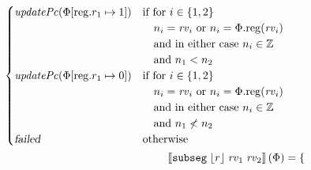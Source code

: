 \documentclass[a4paper]{article}
\newcommand{\update}[2]{[#1 \mapsto #2]}
\newcommand{\sem}[1]{\left\llbracket #1 \right\rrbracket}
\newcommand{\var}[1]{\mathit{#1}}
\newcommand{\rv}{\var{rv}}
\newcommand{\plainproj}[1]{\mathrm{#1}}
\newcommand{\memreg}[1][\Phi]{#1.\plainproj{reg}}
\newcommand{\updateReg}[3][\Phi]{#1\update{\plainproj{reg}.#2}{#3}}
\newcommand{\failed}{\textsl{failed}}
\newcommand{\plainfun}[2]{
  \ifthenelse{\equal{#2}{}}
  {\mathit{#1}}
  {\mathit{#1}(#2)}
}
\newcommand{\stdUpdatePc}[1]{\plainfun{updatePc}{#1}}
\newcommand{\ints}{\mathbb{Z}}
\newcommand{\refreg}[1]{\lfloor #1 \rfloor}
\newcommand{\zinstr}[1]{\mathtt{#1}}
\newcommand{\threeinstr}[4]{\zinstr{#1} \; #2 \; #3 \; #4}
\newcommand{\subseg}[3]{\threeinstr{subseg}{#1}{#2}{#3}}
\begin{document}
\begin{align*}
                                                          \begin{cases}
                                                            \stdUpdatePc{\updateReg{r_1}{1}} &
                                                            \arraycolsep=0pt
                                                            \begin{array}[t]{l}
                                                              \text{if for $i \in \{1,2\}$}\\
                                                              \quad\text{$n_i = \rv_i$ or $n_i = \memreg(\rv_i)$}\\
                                                              \quad\text{and in either case $n_i \in \ints$}\\
                                                              \quad\text{and $n_1 < n_2$}\\                                                                                                            \end{array}\\
                                                            \stdUpdatePc{\updateReg{r_1}{0}} &
                                                            \arraycolsep=0pt
                                                            \begin{array}[t]{l}
                                                              \text{if for $i \in \{1,2\}$}\\
                                                              \quad\text{$n_i = \rv_i$ or $n_i = \memreg(\rv_i)$}\\
                                                              \quad\text{and in either case $n_i \in \ints$}\\
                                                              \quad\text{and $n_1 \not< n_2$}\\                                                                                                            \end{array}\\
                                                            \failed & \text{otherwise}
                                                          \end{cases}
\\
  \sem{\subseg{\refreg{r}}{\rv_1}{\rv_2}}(\Phi) & = 
                                            \begin{cases}

\end{cases}
\end{align*}
\end{document}
